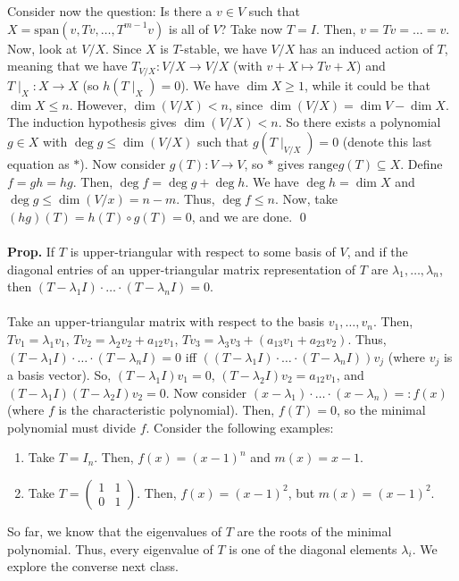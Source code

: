 \\
\\
Consider now the question: Is there a $v \in V$ such that $X = \textrm{span}(v,Tv,\dots,T^{m-1}v)$ is all of $V$? Take now $T=I$. Then, $v = Tv = \dots = v$. Now, look at $V/X$. Since $X$ is $T$-stable, we have $V/X$ has an induced action of $T$, meaning that we have $T_{V/X}: V/X \to V/X$ (with $v + X \mapsto Tv + X$) and $T\mid_X: X \to X$ (so $h(T\mid_X) = 0$). We have $\dim X \geq 1$, while it could be that $\dim X \leq n$. However, $\dim(V/X) < n$, since $\dim(V/X) = \dim V - \dim X$. The induction hypothesis gives $\dim(V/X) < n$. So there exists a polynomial $g \in X$ with $\deg g \leq \dim(V/X)$ such that $g(T\mid_{V/X}) = 0$ (denote this last equation as $\ast$). Now consider $g(T): V \to V$, so $\ast$ gives $\textrm{range} g(T) \subseteq X$. Define $f=gh=hg$. Then, $\deg f = \deg g + \deg h$. We have $\deg h = \dim X$ and $\deg g \leq \dim (V/x) = n-m$. Thus, $\deg f \leq n$. Now, take $(hg)(T) = h(T) \circ g(T) = 0$, and we are done. \qed
\\
\\
\textbf{Prop. } If $T$ is upper-triangular with respect to some basis of $V$, and if the diagonal entries of an upper-triangular matrix representation of $T$ are $\lambda_1,\dots,\lambda_n$, then $(T-\lambda_1I) \cdot \dots \cdot (T-\lambda_nI) = 0$. 
\\
\\
Take an upper-triangular matrix with respect to the basis $v_1,\dots,v_n$. Then, $Tv_1 = \lambda_1v_1$, $Tv_2 = \lambda_2v_2 + a_{12}v_1$, $Tv_3 = \lambda_3v_3 + (a_{13}v_1 + a_{23}v_2)$. Thus, $(T - \lambda_1I) \cdot \dots \cdot (T-\lambda_nI)=0$ iff $((T-\lambda_1I) \cdot \dots \cdot (T-\lambda_nI))v_j$ (where $v_j$ is a basis vector). So, $(T-\lambda_1I)v_1=0$, $(T-\lambda_2I)v_2 = a_{12}v_1$, and $(T-\lambda_1I)(T-\lambda_2I)v_2 = 0$. Now consider $(x-\lambda_1) \cdot \dots \cdot (x-\lambda_n) =: f(x)$ (where $f$ is the characteristic polynomial). Then, $f(T)=0$, so the minimal polynomial must divide $f$. Consider the following examples: 
\\
\begin{enumerate}
	\item Take $T = I_n$. Then, $f(x) = (x-1)^n$ and $m(x) = x-1$. 
	\item Take $T = \begin{pmatrix} 1 & 1 \\ 0 & 1 \end{pmatrix}$. Then, $f(x) = (x-1)^2$, but $m(x) = (x-1)^2$. 
\end{enumerate}

So far, we know that the eigenvalues of $T$ are the roots of the minimal polynomial. Thus, every eigenvalue of $T$ is one of the diagonal elements $\lambda_i$. We explore the converse next class. 


